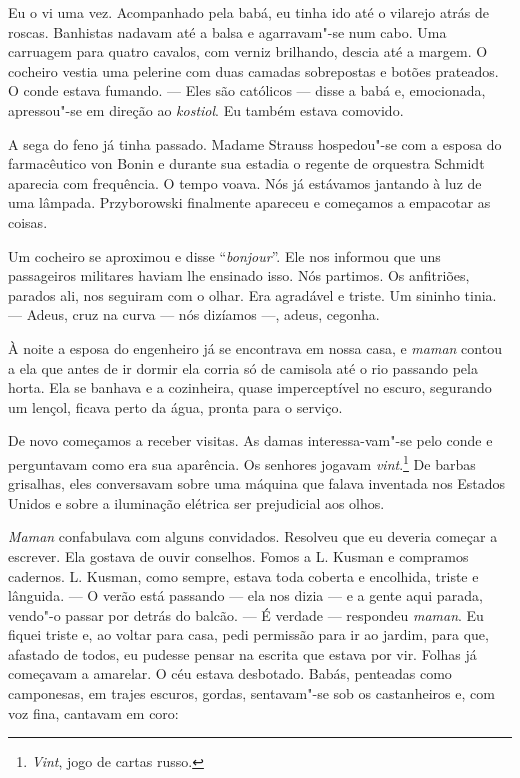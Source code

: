 Eu o vi uma vez. Acompanhado pela babá, eu tinha ido até o vilarejo
atrás de roscas. Banhistas nadavam até a balsa e agarravam"-se num cabo.
Uma carruagem para quatro cavalos, com verniz brilhando, descia até a
margem. O cocheiro vestia uma pelerine com duas camadas sobrepostas e
botões prateados. O conde estava fumando. --- Eles são católicos ---
disse a babá e, emocionada, apressou"-se em direção ao \emph{kostiol}. Eu
também estava comovido.

A sega do feno já tinha passado. Madame Strauss hospedou"-se com a esposa
do farmacêutico von Bonin e durante sua estadia o regente de orquestra
Schmidt aparecia com frequência. O tempo voava. Nós já estávamos
jantando à luz de uma lâmpada. Przyborowski finalmente apareceu e
começamos a empacotar as coisas.

Um cocheiro se aproximou e disse ``\emph{bonjour}''. Ele nos informou
que uns passageiros militares haviam lhe ensinado isso. Nós partimos. Os
anfitriões, parados ali, nos seguiram com o olhar. Era agradável e
triste. Um sininho tinia. --- Adeus, cruz na curva --- nós dizíamos ---,
adeus, cegonha.

À noite a esposa do engenheiro já se encontrava em nossa casa, e
\emph{maman} contou a ela que antes de ir dormir ela corria só de
camisola até o rio passando pela horta. Ela se banhava e a cozinheira,
quase imperceptível no escuro, segurando um lençol, ficava perto da
água, pronta para o serviço.

De novo começamos a receber visitas. As damas interessa-vam"-se pelo conde
e perguntavam como era sua aparência. Os senhores jogavam
\emph{vint}.\footnote{\emph{Vint}, jogo de cartas russo.} De barbas
grisalhas, eles conversavam sobre uma máquina que falava inventada nos
Estados Unidos e sobre a iluminação elétrica ser prejudicial aos olhos.

\emph{Maman} confabulava com alguns convidados. Resolveu que eu deveria
começar a escrever. Ela gostava de ouvir conselhos. Fomos a L. Kusman e
compramos cadernos. L. Kusman, como sempre, estava toda coberta e
encolhida, triste e lânguida. --- O verão está passando --- ela nos
dizia --- e a gente aqui parada, vendo"-o passar por detrás do balcão.
--- É verdade --- respondeu \emph{maman}. Eu fiquei triste e, ao voltar
para casa, pedi permissão para ir ao jardim, para que, afastado de
todos, eu pudesse pensar na escrita que estava por vir. Folhas já
começavam a amarelar. O céu estava desbotado. Babás, penteadas como
camponesas, em trajes escuros, gordas, sentavam"-se sob os castanheiros
e, com voz fina, cantavam em coro:

